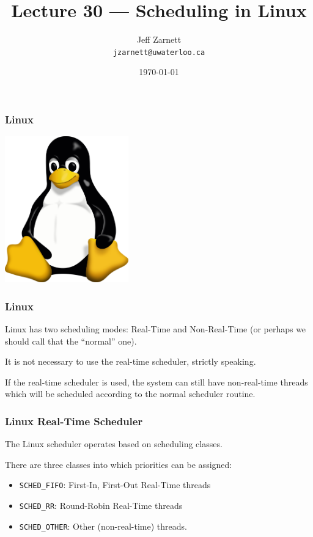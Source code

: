 

\title{Lecture 30 --- Scheduling in Linux }

\author{Jeff Zarnett \\ \small \texttt{jzarnett@uwaterloo.ca}}
\date{\today}




\begin{frame}
  \titlepage

 \end{frame}
 
 
\begin{frame}
\frametitle{Linux}

\begin{center}
	\includegraphics[width=0.4\textwidth]{images/tux.png}
\end{center}


 \end{frame}
 
 
\begin{frame}
\frametitle{Linux}


Linux has two scheduling modes: Real-Time and Non-Real-Time (or perhaps we should call that the ``normal'' one). 

It is not necessary to use the real-time scheduler, strictly speaking. 

If the real-time scheduler is used, the system can still have non-real-time threads which will be scheduled according to the normal scheduler routine.

\end{frame}

\begin{frame}
\frametitle{Linux Real-Time Scheduler}

The Linux scheduler operates based on \alert{scheduling classes}.

There are three classes into which priorities can be assigned:

\begin{itemize}
	\item \texttt{SCHED\_FIFO}: First-In, First-Out Real-Time threads
	\item \texttt{SCHED\_RR}: Round-Robin Real-Time threads
	\item \texttt{SCHED\_OTHER}: Other (non-real-time) threads.
\end{itemize}

\end{frame}

